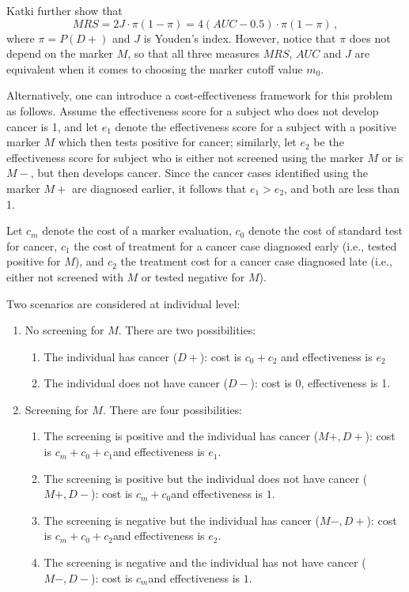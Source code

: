 \documentclass[11pt]{article}
\begin{document}
Katki \cite{katki} further show that 
\begin{equation}\label{MRS_AUC}
MRS=2J\cdot \pi(1-\pi)=4(AUC-0.5)\cdot \pi(1-\pi)\,,
\end{equation}
where $\pi=P(D+)$ and $J$ is Youden's index. However, notice that $\pi$ does not depend on the marker $M$, so that all three measures $MRS$, $AUC$ and $J$ are equivalent when it comes to choosing the marker cutoff value $m_0$. 

Alternatively, one can introduce a cost-effectiveness framework for this problem as follows. Assume the effectiveness score for a subject who does not develop cancer is 1, and let $e_1$ denote the effectiveness score for a subject with a positive marker $M$ which then tests positive for cancer; similarly, let $e_2$ be the effectiveness score for subject who is either not screened using the marker $M$ or is $M-$, but then develops cancer. Since the cancer cases identified using the marker $M+$ are diagnosed earlier, it follows that $e_1 > e_2$, and both are less than 1. 

Let $c_m$ denote the cost of a marker evaluation, $c_0$ denote the cost of standard test for cancer, $c_1$ the cost of treatment for a cancer case diagnosed early (i.e., tested positive for $M$), and $c_2$ the treatment cost for a cancer case diagnosed late (i.e., either not screened with $M$ or tested negative for $M$). 

Two scenarios are considered at individual level:
\begin{enumerate}
   \item{No screening for $M$. There are two possibilities:
     \begin{enumerate}
        \item{The individual has cancer ($D+$): cost is $c_0+c_2$ and effectiveness is $e_2$}
        \item{The individual does not have cancer ($D-$): cost is 0, effectiveness is 1.}
     \end{enumerate}
   }
   \item{Screening for $M$. There are four possibilities:
      \begin{enumerate}
        \item{The screening is positive and the individual has cancer ($M+,D+$): cost is $c_m+c_0+c_1$and effectiveness is $e_1$.}
        \item{The screening is positive but the individual does not have cancer ($M+,D-$): cost is $c_m+c_0$and effectiveness is $1$.}
        \item{The screening is negative but the individual has cancer ($M-,D+$): cost is $c_m+c_0+c_2$and effectiveness is $e_2$.}
        \item{The screening is negative and the individual has not have cancer ($M-,D-$): cost is $c_m$and effectiveness is $1$.}
      \end{enumerate}  
   }
\end{enumerate}
\end{document}
